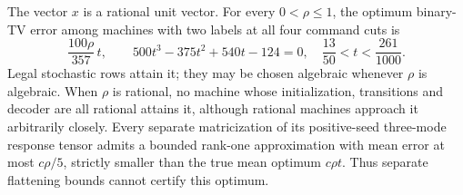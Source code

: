 \begin{theorem}\label{thm:orthogonal50}
The vector $x$ is a rational unit vector. For every $0<\rho\le1$,
the optimum binary-TV error among machines with two labels at all
four command cuts is
\begin{equation}\label{eq:orthogonal-opt50}
 \frac{100\rho}{357}\,t,
 \qquad 500t^3-375t^2+540t-124=0,
 \quad\frac{13}{50}<t<\frac{261}{1000}.
\end{equation}
Legal stochastic rows attain it; they may be chosen algebraic whenever
$\rho$ is algebraic. When $\rho$ is rational, no machine
whose initialization, transitions and decoder are all rational attains
it, although rational machines approach it arbitrarily closely.
Every separate matricization of its positive-seed three-mode response
tensor admits a bounded rank-one approximation with mean error at most
$c\rho/5$, strictly smaller than the true mean optimum $c\rho t$.
Thus separate flattening bounds cannot certify this optimum.
\end{theorem}
